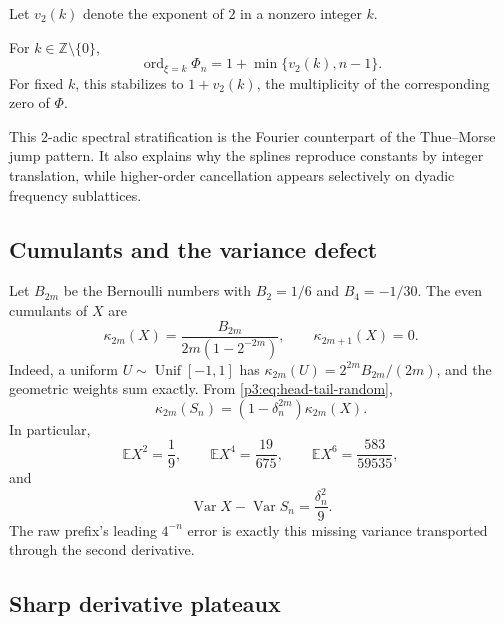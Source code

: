 \documentclass[11pt,oneside]{article}
\numberwithin{equation}{section}
\theoremstyle{definition}
\theoremstyle{remark}
\newcommand{\E}{\mathbb E}
\newcommand{\Var}{\operatorname{Var}}
\begin{document}
Let $v_2(k)$ denote the exponent of $2$ in a nonzero integer $k$.

\begin{proposition}
\label{p3:prop:zero-multiplicity}
For $k\in\mathbb Z\setminus\{0\}$,
\begin{equation}
 \operatorname{ord}_{\xi=k}\Phi_n
 =1+\min\{v_2(k),n-1\}.
 \label{p3:eq:zero-multiplicity}
\end{equation}
For fixed $k$, this stabilizes to $1+v_2(k)$, the multiplicity of the corresponding
zero of $\Phi$.
\end{proposition}

This $2$-adic spectral stratification is the Fourier counterpart of the Thue--Morse
jump pattern.  It also explains why the splines reproduce constants by integer
translation, while higher-order cancellation appears selectively on dyadic frequency
sublattices.

\subsection{Cumulants and the variance defect}

Let $B_{2m}$ be the Bernoulli numbers with $B_2=1/6$ and $B_4=-1/30$.
The even cumulants of $X$ are
\begin{equation}
 \kappa_{2m}(X)=\frac{B_{2m}}{2m(1-2^{-2m})},
 \qquad \kappa_{2m+1}(X)=0.
 \label{p3:eq:cumulants-X}
\end{equation}
Indeed, a uniform $U\sim\operatorname{Unif}[-1,1]$ has
$\kappa_{2m}(U)=2^{2m}B_{2m}/(2m)$, and the geometric weights sum exactly.
From \cref{p3:eq:head-tail-random},
\begin{equation}
 \kappa_{2m}(S_n)=(1-\delta_n^{2m})\kappa_{2m}(X).
 \label{p3:eq:cumulants-prefix}
\end{equation}
In particular,
\begin{equation}
 \E X^2=\frac19,
 \qquad
 \E X^4=\frac{19}{675},
 \qquad
 \E X^6=\frac{583}{59535},
 \label{p3:eq:central-moments}
\end{equation}
and
\begin{equation}
 \Var X-\Var S_n=\frac{\delta_n^2}{9}.
 \label{p3:eq:variance-defect}
\end{equation}
The raw prefix's leading $4^{-n}$ error is exactly this missing variance transported
through the second derivative.

\subsection{Sharp derivative plateaux}
\end{document}
